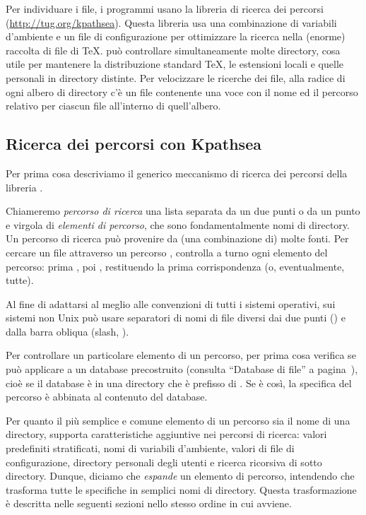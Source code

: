 \documentclass{article}
\begin{document}
Per individuare i file, i programmi \Webc{} usano la libreria di ricerca
dei percorsi \KPS{} (\url{http://tug.org/kpathsea}). Questa libreria usa
una combinazione di variabili d'ambiente e un file di configurazione per
ottimizzare la ricerca nella (enorme) raccolta di file di \TeX{}. \Webc{}
può controllare simultaneamente molte directory, cosa utile per mantenere
la distribuzione standard \TeX{}, le estensioni locali e quelle personali
in directory distinte. Per velocizzare le ricerche dei file, alla radice
di ogni albero di directory c'è un file  contenente una voce
con il nome ed il percorso relativo per ciascun file all'interno di
quell'albero.


\subsection{Ricerca dei percorsi con Kpathsea}
\label{sec:kpathsea}

Per prima cosa descriviamo il generico meccanismo di ricerca dei percorsi
della libreria \KPS.

Chiameremo \emph{percorso di ricerca} una lista separata da un due punti o
da un punto e virgola di \emph{elementi di percorso}, che sono
fondamentalmente nomi di directory. Un percorso di ricerca può provenire
da (una combinazione di) molte fonti. Per cercare un file 
attraverso un percorso , \KPS{} controlla a turno ogni
elemento del percorso: prima , poi ,
restituendo la prima corrispondenza (o, eventualmente, tutte).

Al fine di adattarsi al meglio alle convenzioni di tutti i sistemi
operativi, sui sistemi non Unix \KPS{} può usare separatori di nomi di
file diversi dai due punti (\samp{:}) e dalla barra obliqua (slash, \samp{/}).

Per controllare un particolare elemento  di un percorso, \KPS{} per
prima cosa verifica se può applicare a  un database precostruito
(consulta ``Database di file'' a pagina~\pageref{sec:filename-database}),
cioè se il database è in una directory che è prefisso di . Se è
così, la specifica del percorso è abbinata al contenuto del
database.

Per quanto il più semplice e comune elemento di un percorso sia il nome di
una directory, \KPS{} supporta caratteristiche aggiuntive nei percorsi di
ricerca: valori predefiniti stratificati, nomi di variabili
d'ambiente, valori di file di configurazione, directory personali degli
utenti e ricerca ricorsiva di sotto directory. Dunque, diciamo che \KPS{}
\emph{espande} un elemento di percorso, intendendo che trasforma tutte le
specifiche in semplici nomi di directory. Questa trasformazione è
descritta nelle seguenti sezioni nello stesso ordine in cui avviene.
\end{document}
